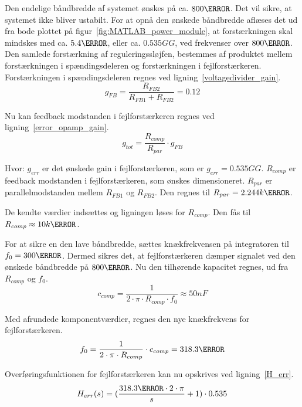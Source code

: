 Den endelige båndbredde af systemet ønskes på ca. $800\hertz$. Det vil sikre, at systemet ikke bliver ustabilt. For at opnå den ønskede båndbredde aflæses det ud fra bode plottet på figur~\ref{fig:MATLAB_power_module}, at forstærkningen skal mindskes med ca. $5.4\decibel$, eller ca. $0.535GG$, ved frekvenser over $800\hertz$. Den samlede forstærkning af reguleringssløjfen, bestemmes af produktet mellem forstærkningen i spændingsdeleren og forstærkningen i fejlforstærkeren. Forstærkningen i spændingsdeleren regnes ved ligning~\ref{voltagedivider_gain}.
\begin{equation} \label{voltagedivider_gain}
g_{FB} = \frac{R_{FB2}}{R_{FB1}+R_{FB2}} = 0.12
\end{equation}

\noindent Nu kan feedback modstanden i fejlforstærkeren regnes ved ligning~\ref{error_opamp_gain}. 
\begin{equation} \label{error_opamp_gain}
g_{tot} = \frac{R_{comp}}{R_{par}} \cdot g_{FB}
\end{equation}

\noindent Hvor:
\newline \noindent $g_{err}$ er det ønskede gain i fejlforstærkeren, som er $g_{err}=0.535GG$.
\newline \noindent $R_{comp}$ er feedback modstanden i fejlforstærkeren, som ønskes dimensioneret.
\newline \noindent $R_{par}$ er parallelmodstanden mellem $R_{FB1}$ og $R_{FB2}$. Den regnes til $R_{par}=2.244k\ohm$.

\noindent De kendte værdier indsættes og ligningen løses for $R_{comp}$. Den fås til $R_{comp}\approx 10k\ohm$.


\noindent For at sikre en den lave båndbredde, sættes knækfrekvensen på integratoren til $f_0=300\hertz$. Dermed sikres det, at fejlforstærkeren dæmper signalet ved den ønskede båndbredde på $800\hertz$. Nu den tilhørende kapacitet regnes, ud fra $R_{comp}$ og $f_0$.
\begin{equation} \label{c_comp}
c_{comp} = \frac{1}{2\cdot \pi \cdot R_{comp} \cdot f_0} \approx 50nF
\end{equation}

\noindent Med afrundede komponentværdier, regnes den nye knækfrekvens for fejlforstærkeren.
\begin{equation} \label{f_0}
f_0 = \frac{1}{2\cdot \pi \cdot R_{comp}} \cdot c_{comp} = 318.3\hertz
\end{equation}

\noindent Overføringsfunktionen for fejlforstærkeren kan nu opskrives ved ligning~\ref{H_err}.
\begin{equation} \label{H_err}
H_{err}(s) = (\frac{318.3\hertz \cdot 2\cdot\pi}{s} + 1) \cdot 0.535
\end{equation}

